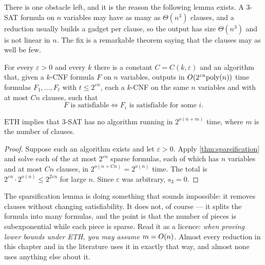 There is one obstacle left, and it is the reason the following lemma exists. A
$3$-SAT formula on $n$ variables may have as many as $\Theta(n^3)$ clauses, and
a reduction usually builds a gadget per clause, so the output has size
$\Theta(n^3)$ and is not linear in $n$. The fix is a remarkable theorem saying
that the clauses may as well be few.

\begin{theorem}
\label{thm:sparsification}
For every $\varepsilon > 0$ and every $k$ there is a constant
$C = C(k,\varepsilon)$ and an algorithm that, given a $k$-CNF formula $F$ on
$n$ variables, outputs in $O\!\left(2^{\varepsilon n}\mathrm{poly}(n)\right)$ time formulas
$F_1, \ldots, F_t$ with $t \le 2^{\varepsilon n}$, each a $k$-CNF on the same
$n$ variables and with at most $Cn$ clauses, such that
\[ F \text{ is satisfiable} \iff F_i \text{ is satisfiable for some } i. \]
\end{theorem}

\begin{corollary}\label{cor:eth-sparse}
$\mathrm{ETH}$ implies that $3$-SAT has no algorithm running in $2^{o(n+m)}$
time, where $m$ is the number of clauses.
\end{corollary}

\begin{proof}
Suppose such an algorithm exists and let $\varepsilon > 0$. Apply
\cref{thm:sparsification} and solve each of the at most $2^{\varepsilon n}$
sparse formulas, each of which has $n$ variables and at most $Cn$ clauses, in
$2^{o(n + Cn)} = 2^{o(n)}$ time. The total is
$2^{\varepsilon n} \cdot 2^{o(n)} \le 2^{2\varepsilon n}$ for large $n$. Since
$\varepsilon$ was arbitrary, $s_3 = 0$.
\end{proof}

\begin{intuition}
The sparsification lemma is doing something that sounds impossible: it removes
clauses without changing satisfiability. It does not, of course --- it splits
the formula into many formulas, and the point is that the number of pieces is
subexponential while each piece is sparse. Read it as a licence: \emph{when
proving lower bounds under ETH, you may assume $m = O\!\left(n\right)$}. Almost every
reduction in this chapter and in the literature uses it in exactly that way,
and almost none uses anything else about it.
\end{intuition}

